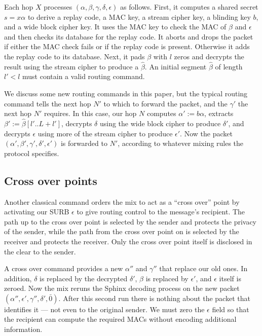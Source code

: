 \documentclass[twoside,letterpaper]{llncs}
\begin{document}

Each hop $X$ processes $(\alpha,\beta,\gamma,\delta,\epsilon)$
as follows.  First, it computes a shared secret $s = x \alpha$ to
derive a replay code, a MAC key, a stream cipher key, 
 a blinding key $b$, and a wide block cipher key. 
It uses the MAC key to check the MAC of $\beta$ and $\epsilon$ and
 then checks its database for the replay code.
It aborts and drops the packet if either the MAC check fails or
 if the replay code is present.  Otherwise it adds the replay code
 to its database.
Next, it pads $\beta$ with $l$ zeros and decrypts the result
 using the stream cipher to produce a $\hat\beta$.
An initial segment $\hat\beta$ of length $l' < l$ must contain
a valid routing command.  

We discuss some new routing commands in this paper, but the typical
routing command tells the next hop $N'$ to which to forward the
packet, and the $\gamma'$ the next hop $N'$ requires. 
In this case, our hop $N$ computes $\alpha' := b \alpha$,
extracts $\beta' := \hat\beta[l'..L+l']$,
decrypts $\delta$ using the wide block cipher
 to produce $\delta'$, and
decrypts $\epsilon$ using more of the stream cipher
 to produce $\epsilon'$.
Now the packet $(\alpha',\beta',\gamma',\delta',\epsilon')$ is
forwarded to $N'$,
 according to whatever mixing rules the protocol specifies.


\subsection{Cross over points}


Another classical command orders the mix to act as a ``cross over''
point by activating our SURB $\epsilon$ to give routing control to
the message's recipient.  The path up to the cross over point
is selected by the sender and protects the privacy of the sender,
while the path from the cross over point on is selected by the
receiver and protects the receiver.  Only the cross over point
itself is disclosed in the clear to the sender.

A cross over command provides a new
$\alpha''$ and $\gamma''$ that replace our old ones.  
In addition, $\delta$ is replaced by the decrypted $\delta'$, 
$\beta$ is replaced by $\epsilon'$, and $\epsilon$ itself is zeroed.
Now the mix reruns the Sphinx decoding process on the new packet
$(\alpha'',\epsilon',\gamma'',\delta',\bar{0})$.  
After this second run there is nothing about the packet that 
identifies it --- not even to the original sender.
We must zero the $\epsilon$ field so that the recipient can compute
the required MACs without encoding additional information. 
\end{document}
